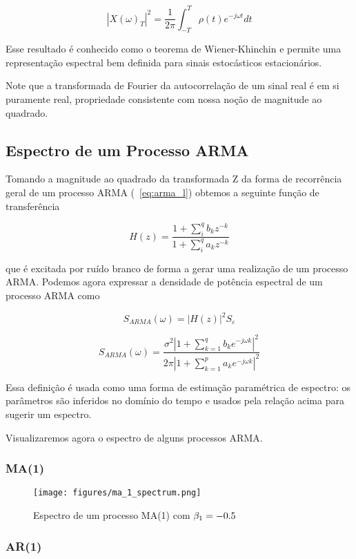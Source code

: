 $$|X(\omega)_T|^2 = \frac{1}{2\pi}\int_{-T}^{T} \rho(t)e^{-j \omega t}dt$$

Esse resultado é conhecido como o teorema de Wiener-Khinchin e permite uma
representação espectral bem definida para sinais estocásticos estacionários.

Note que a transformada de Fourier da autocorrelação de um sinal real é
em si puramente real, propriedade consistente com nossa noção de magnitude ao
quadrado.

\subsection{Espectro de um Processo ARMA}

Tomando a magnitude ao quadrado da transformada Z da forma de recorrência
geral de um processo ARMA (~\ref{eq:arma_l}) obtemos a seguinte função de
transferência

$$ H(z) = \frac{1 + \sum_{i}^{q} b_k z^{-k}}{1 + \sum_{i}^{q} a_k z^{-k}} $$

que é excitada por ruído branco de forma a gerar uma realização de um processo
ARMA. Podemos agora expressar a densidade de potência espectral de um processo
ARMA como

$$ S_{ARMA}(\omega) = |H(z)|^2 S_{\varepsilon} $$

\begin{equation}\label{eq:arma_spectrum}
     S_{ARMA}(\omega) = \frac{\sigma^2 |1 + \sum_{k=1}^{q} b_k e^{-j\omega k}|^2}{2\pi|1 + \sum_{k=1}^{p} a_k e^{-j\omega k}|^2}
\end{equation}

Essa definição é usada como uma forma de estimação paramétrica de espectro:
os parâmetros são inferidos no domínio do tempo e usados pela relação acima
para sugerir um espectro.

Visualizaremos agora o espectro de alguns processos ARMA.

\subsubsection{MA(1)}

\begin{figure}[H]
    \centering
    \texttt{[image: figures/ma\_1\_spectrum.png]}
    \caption{Espectro de um processo MA(1) com
    $\protect \beta_1 = -0.5$}
    \label{fig:ma_1_spectrum}
\end{figure}

\subsubsection{AR(1)}

